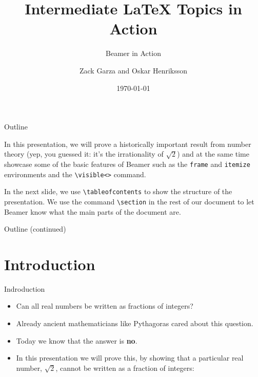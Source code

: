 \documentclass[t]{beamer} %
\title[Intermediate {\LaTeX} Topics]{Intermediate {\LaTeX} Topics in Action}
\subtitle{Beamer in Action}
\author[D. Z. Garza, D. O. Henriksson]{Zack Garza and Oskar Henriksson}
\institute[UCSD]{University of California, San Diego}
\date{\today}
\begin{document}
 
\begin{frame}
\titlepage
\end{frame}

\begin{frame}[fragile]{Outline} %

    In this presentation, we will prove a historically important result from number theory (yep, you guessed it: it's the irrationality of $\sqrt{2}$) and at the same time showcase some of the basic features of Beamer such as the \verb$frame$ and \verb$itemize$ environments and the \verb$\visible<>$ command.
    
    In the next slide, we use \verb$\tableofcontents$ to show the structure of the presentation. We use the command \verb$\section$ in the rest of our document to let Beamer know what the main parts of the document are.

\end{frame}

\begin{frame}{Outline (continued)}

    \tableofcontents[pausesections]
    
\end{frame}

\section{Introduction}

\begin{frame}{Indroduction}

    \begin{itemize}
        \item<2-> Can all real numbers be written as fractions of integers?
        \item<3-> Already ancient mathematicians like Pythagoras cared about this question.
        \item<4-> Today we know that the answer is \textbf{no}.
        \item<5-> In this presentation we will prove this, by showing that a particular real number, $\sqrt{2}$, cannot be written as a fraction of integers:
    \end{itemize}



\end{frame}
\end{document}
